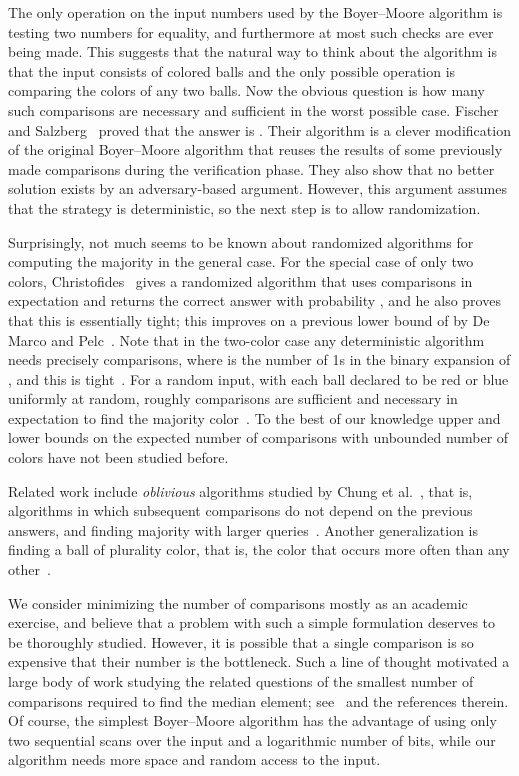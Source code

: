 \documentclass{article}[11pt,a4paper]
\begin{document}
The only operation on the input numbers used by the Boyer--Moore algorithm is testing
two numbers for equality, and furthermore at most  such checks are ever being made.
This suggests that the natural way to think about the algorithm is that the input consists
of  colored balls and the only possible operation is comparing the colors of any two
balls. Now the obvious question is how many such comparisons are necessary and
sufficient in the worst possible case. Fischer and Salzberg~\cite{FischerSalzberg} proved that the answer is
. Their algorithm is a clever modification of
the original Boyer--Moore algorithm that reuses the results of some previously made
comparisons during the verification phase. They also show that no better solution
exists by an adversary-based argument. However, this argument assumes that the
strategy is deterministic, so the next step is to allow randomization.

Surprisingly, not much seems to be known about randomized algorithms for computing
the majority in the general case. For the special case of only two colors, 
Christofides~\cite{Christofides} gives a randomized algorithm that uses 
comparisons in expectation and returns the correct answer with probability ,
and he also proves that this is essentially tight; this improves on
a previous lower bound of  by De Marco and Pelc~\cite{MarcoPelc}.
Note that in the two-color case any deterministic algorithm needs precisely  comparisons, where 
is the number of 1s in the binary expansion of , and this is 
tight~\cite{SaksWerman,AlonsoLowerbound,Wiener}. For a random input, with each
ball declared to be red or blue uniformly at random, roughly  comparisons
are sufficient and necessary in expectation to find the majority color~\cite{AlonsoAverage}.
To the best of our knowledge upper and lower bounds on the expected number
of comparisons with unbounded number of colors have not been studied
before.

Related work include \emph{oblivious} algorithms studied by Chung et al.~\cite{oblivious},
that is, algorithms in which subsequent comparisons do not depend on the previous answers,
and finding majority with larger queries~\cite{MarcoK15,Eppstein,VizerGKPPW15}.
Another generalization is finding a ball of plurality color, that is, the color that occurs
more often than any other~\cite{AignerMM05,GerbnerKPP13,KralST08}.

We consider minimizing the number of comparisons mostly as an academic exercise,
and believe that a problem with such a simple formulation deserves to be thoroughly
studied. However, it is possible that a single comparison is so expensive that their number
is the bottleneck. Such a line of thought motivated a large body of work
studying the related questions of the smallest number of comparisons required to find
the median element; see~\cite{DorZ99,DorZ01,paterson1996progress} and the references
therein. Of course, the simplest Boyer--Moore algorithm has the advantage of
using only two sequential
scans over the input and a logarithmic number of bits, while our algorithm
needs more space
and random access to the input.
\end{document}
